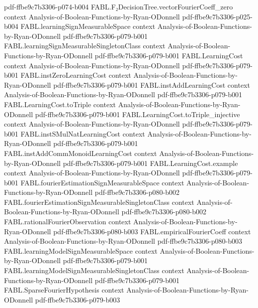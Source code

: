 \begin{theorem}
  {pdf-ffbe9c7b3306-p074-b004}
\proofstep
  {FABL.F₂DecisionTree.vectorFourierCoeff_zero}
  {context}
  {Analysis-of-Boolean-Functions-by-Ryan-ODonnell}
  {pdf-ffbe9c7b3306-p025-b004}
\proofstep
  {FABL.learningSignMeasurableSpace}
  {context}
  {Analysis-of-Boolean-Functions-by-Ryan-ODonnell}
  {pdf-ffbe9c7b3306-p079-b001}
\proofstep
  {FABL.learningSignMeasurableSingletonClass}
  {context}
  {Analysis-of-Boolean-Functions-by-Ryan-ODonnell}
  {pdf-ffbe9c7b3306-p079-b001}
\proofstep
  {FABL.LearningCost}
  {context}
  {Analysis-of-Boolean-Functions-by-Ryan-ODonnell}
  {pdf-ffbe9c7b3306-p079-b001}
\proofstep
  {FABL.instZeroLearningCost}
  {context}
  {Analysis-of-Boolean-Functions-by-Ryan-ODonnell}
  {pdf-ffbe9c7b3306-p079-b001}
\proofstep
  {FABL.instAddLearningCost}
  {context}
  {Analysis-of-Boolean-Functions-by-Ryan-ODonnell}
  {pdf-ffbe9c7b3306-p079-b001}
\proofstep
  {FABL.LearningCost.toTriple}
  {context}
  {Analysis-of-Boolean-Functions-by-Ryan-ODonnell}
  {pdf-ffbe9c7b3306-p079-b001}
\proofstep
  {FABL.LearningCost.toTriple_injective}
  {context}
  {Analysis-of-Boolean-Functions-by-Ryan-ODonnell}
  {pdf-ffbe9c7b3306-p079-b001}
\proofstep
  {FABL.instSMulNatLearningCost}
  {context}
  {Analysis-of-Boolean-Functions-by-Ryan-ODonnell}
  {pdf-ffbe9c7b3306-p079-b001}
\proofstep
  {FABL.instAddCommMonoidLearningCost}
  {context}
  {Analysis-of-Boolean-Functions-by-Ryan-ODonnell}
  {pdf-ffbe9c7b3306-p079-b001}
\proofstep
  {FABL.LearningCost.example}
  {context}
  {Analysis-of-Boolean-Functions-by-Ryan-ODonnell}
  {pdf-ffbe9c7b3306-p079-b001}
\proofstep
  {FABL.fourierEstimationSignMeasurableSpace}
  {context}
  {Analysis-of-Boolean-Functions-by-Ryan-ODonnell}
  {pdf-ffbe9c7b3306-p080-b002}
\proofstep
  {FABL.fourierEstimationSignMeasurableSingletonClass}
  {context}
  {Analysis-of-Boolean-Functions-by-Ryan-ODonnell}
  {pdf-ffbe9c7b3306-p080-b002}
\proofstep
  {FABL.rationalFourierObservation}
  {context}
  {Analysis-of-Boolean-Functions-by-Ryan-ODonnell}
  {pdf-ffbe9c7b3306-p080-b003}
\proofstep
  {FABL.empiricalFourierCoeff}
  {context}
  {Analysis-of-Boolean-Functions-by-Ryan-ODonnell}
  {pdf-ffbe9c7b3306-p080-b003}
\proofstep
  {FABL.learningModelSignMeasurableSpace}
  {context}
  {Analysis-of-Boolean-Functions-by-Ryan-ODonnell}
  {pdf-ffbe9c7b3306-p079-b001}
\proofstep
  {FABL.learningModelSignMeasurableSingletonClass}
  {context}
  {Analysis-of-Boolean-Functions-by-Ryan-ODonnell}
  {pdf-ffbe9c7b3306-p079-b001}
\proofstep
  {FABL.SparseFourierHypothesis}
  {context}
  {Analysis-of-Boolean-Functions-by-Ryan-ODonnell}
  {pdf-ffbe9c7b3306-p079-b003}

\end{theorem}
